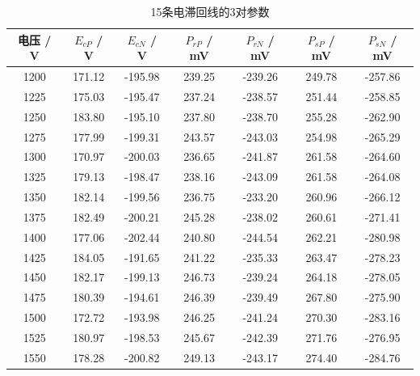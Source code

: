 \documentclass[a4paper]{article}
\begin{document}
\begin{table}[!ht]
    \centering
    \begin{tabular}{|c|c|c|c|c|c|c|}
        \hline
        电压 / V & $E_{cP}$ / V & $E_{cN}$ / V & $P_{rP}$ / mV & $P_{rN}$ / mV & $P_{sP}$ / mV & $P_{sN}$ / mV \\ \hline
        1200     & 171.12       & -195.98      & 239.25        & -239.26       & 249.78        & -257.86       \\ \hline
        1225     & 175.03       & -195.47      & 237.24        & -238.57       & 251.44        & -258.85       \\ \hline
        1250     & 183.80       & -195.10      & 237.80        & -238.70       & 255.28        & -262.90       \\ \hline
        1275     & 177.99       & -199.31      & 243.57        & -243.03       & 254.98        & -265.29       \\ \hline
        1300     & 170.97       & -200.03      & 236.65        & -241.87       & 261.58        & -264.60       \\ \hline
        1325     & 179.13       & -198.47      & 238.16        & -243.09       & 261.58        & -264.08       \\ \hline
        1350     & 182.14       & -199.56      & 236.75        & -233.20       & 260.96        & -266.12       \\ \hline
        1375     & 182.49       & -200.21      & 245.28        & -238.02       & 260.61        & -271.41       \\ \hline
        1400     & 177.06       & -202.44      & 240.80        & -244.54       & 262.21        & -280.98       \\ \hline
        1425     & 184.05       & -191.65      & 241.22        & -235.33       & 263.47        & -278.23       \\ \hline
        1450     & 182.17       & -199.13      & 246.73        & -239.24       & 264.18        & -278.05       \\ \hline
        1475     & 180.39       & -194.61      & 246.39        & -239.49       & 267.80        & -275.90       \\ \hline
        1500     & 172.72       & -193.98      & 246.25        & -241.24       & 270.30        & -283.16       \\ \hline
        1525     & 180.97       & -198.53      & 245.67        & -242.39       & 271.76        & -276.95       \\ \hline
        1550     & 178.28       & -200.82      & 249.13        & -243.17       & 274.40        & -284.76       \\ \hline
    \end{tabular}
    \caption{15条电滞回线的3对参数}\label{parameters}
\end{table}
\end{document}
